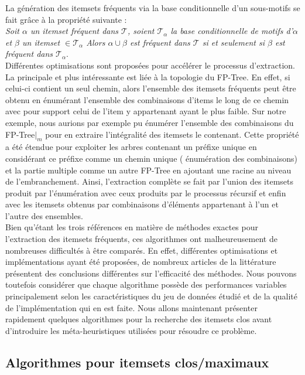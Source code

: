 \documentclass[a4paper,10pt]{report}
\begin{document}
La génération des itemsets fréquents via la base conditionnelle d'un sous-motifs se fait grâce à la propriété suivante : \\

\emph{Soit $\alpha$ un itemset fréquent dans $\mathcal{T}$, soient $\mathcal{T}_{\alpha}$ la base conditionnelle de motifs d'$\alpha$ et $\beta$ un itemset $\in \mathcal{T}_{\alpha}$ Alors $\alpha \cup \beta$ est fréquent dans $\mathcal{T}$ si et seulement si $\beta$ est fréquent dans $\mathcal{T}_{\alpha}$}. \\

Différentes optimisations sont proposées pour accélérer le processus d'extraction. La principale et plus intéressante est liée à la topologie du FP-Tree. En effet, si celui-ci contient un seul chemin, alors l'ensemble des itemsets fréquents peut être obtenu en énumérant l'ensemble des combinaisons d'items le long de ce chemin avec pour support celui de l'item y appartenant ayant le plus faible. Sur notre exemple, nous aurions par exemple pu énumérer l'ensemble des combinaisons du FP-Tree$|_{m}$ pour en extraire l'intégralité des itemsets le contenant. Cette propriété a été étendue pour exploiter les arbres contenant un préfixe unique en considérant ce préfixe comme un chemin unique ( énumération des combinaisons) et la partie multiple comme un autre FP-Tree en ajoutant une racine au niveau de l'embranchement. Ainsi, l'extraction complète se fait par l'union des itemsets produit par l'énumération avec ceux produits par le processus récursif et enfin avec les itemsets obtenus par combinaisons d'éléments appartenant à l'un et l'autre des ensembles. \\

Bien qu'étant les trois références en matière de méthodes exactes pour l'extraction des itemsets fréquents, ces algorithmes ont malheureusement de nombreuses difficultés à être comparés. En effet, différentes optimisations et implémentations ayant été proposées, de nombreux articles de la littérature présentent des conclusions différentes sur l'efficacité des méthodes. Nous pouvons toutefois considérer que chaque algorithme possède des performances variables principalement selon les caractéristiques du jeu de données étudié et de la qualité de l'implémentation qui en est faite. Nous allons maintenant présenter rapidement quelques algorithmes pour la recherche des itemsets clos avant d'introduire les méta-heuristiques utilisées pour résoudre ce problème.

\subsection{Algorithmes pour itemsets clos/maximaux}
\end{document}
